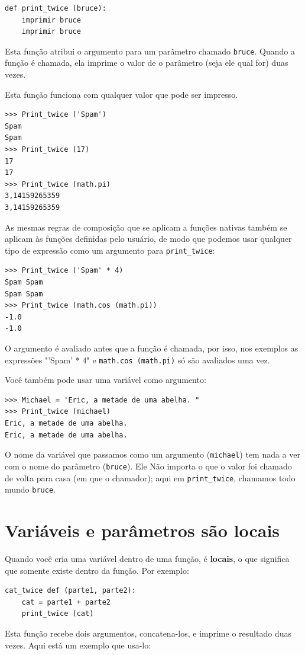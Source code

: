 \documentclass[10pt]{book}
\begin{document}
\begin{verbatim}
def print_twice (bruce):
    imprimir bruce
    imprimir bruce
\end{verbatim}
%
Esta função atribui o argumento para um parâmetro
chamado {\tt bruce}. Quando a função é chamada, ela imprime o valor de
o parâmetro (seja ele qual for) duas vezes.

Esta função funciona com qualquer valor que pode ser impresso.

\begin{verbatim}
>>> Print_twice ('Spam')
Spam
Spam
>>> Print_twice (17)
17
17
>>> Print_twice (math.pi)
3,14159265359
3,14159265359
\end{verbatim}
%
As mesmas regras de composição que se aplicam a funções nativas também
se aplicam às funções definidas pelo usuário, de modo que podemos usar qualquer tipo de expressão
como um argumento para \verb "print_twice":

\begin{verbatim}
>>> Print_twice ('Spam' * 4)
Spam Spam
Spam Spam
>>> Print_twice (math.cos (math.pi))
-1.0
-1.0
\end{verbatim}
%
O argumento é avaliado antes que a função é chamada, por isso,
nos exemplos as expressões \verbo "'Spam' * 4" e
{\tt math.cos (math.pi)} só são avaliados uma vez.

Você também pode usar uma variável como argumento:

\begin{verbatim}
>>> Michael = 'Eric, a metade de uma abelha. "
>>> Print_twice (michael)
Eric, a metade de uma abelha.
Eric, a metade de uma abelha.
\end{verbatim}
%
O nome da variável que passamos como um argumento ({\tt michael}) tem
nada a ver com o nome do parâmetro ({\tt bruce}). Ele
Não importa o que o valor foi chamado de volta para casa (em que o chamador);
aqui em \verb "print_twice", chamamos todo mundo {\tt bruce}.


\section {Variáveis ​​e parâmetros são locais}

Quando você cria uma variável dentro de uma função, é {\bf locais},
o que significa que somente
existe dentro da função. Por exemplo:

\begin{verbatim}
cat_twice def (parte1, parte2):
    cat = parte1 + parte2
    print_twice (cat)
\end{verbatim}
%
Esta função recebe dois argumentos, concatena-los, e imprime
o resultado duas vezes. Aqui está um exemplo que usa-lo:
\end{document}
